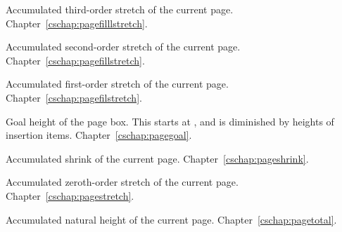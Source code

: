 \begin{glossinventory}
\item [\cs{pagefilllstretch}]
      Accumulated third-order stretch of the current page.
Chapter~\ref{cschap:pagefilllstretch}.

\item [\cs{pagefillstretch}]
      Accumulated second-order stretch of the current page.
Chapter~\ref{cschap:pagefillstretch}.

\item [\cs{pagefilstretch}]
      Accumulated first-order stretch of the current page.
Chapter~\ref{cschap:pagefilstretch}.

\item [\cs{pagegoal}]
      Goal height of the page box. This starts at ,
      and is diminished by heights of insertion items.
Chapter~\ref{cschap:pagegoal}.

\item [\cs{pageshrink}]
      Accumulated shrink of the current page.
Chapter~\ref{cschap:pageshrink}.

\item [\cs{pagestretch}]
      Accumulated zeroth-order stretch of the current page.
Chapter~\ref{cschap:pagestretch}.

\item [\cs{pagetotal}]
      Accumulated natural height of the current page.
Chapter~\ref{cschap:pagetotal}.


\end{glossinventory}
